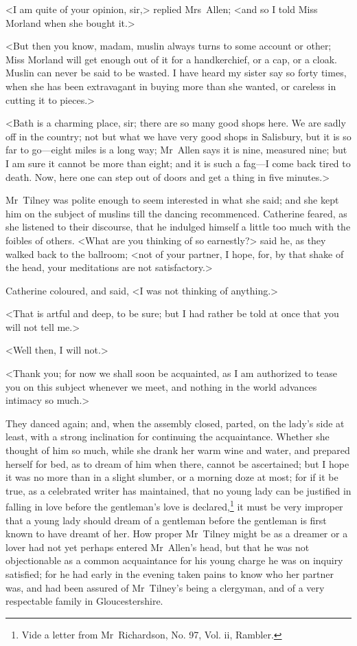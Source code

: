  <I am quite of your opinion, sir,> replied Mrs~Allen; <and so I told Miss Morland when she bought it.> 

 <But then you know, madam, muslin always turns to some account or other; Miss Morland will get enough out of it for a handkerchief, or a cap, or a cloak. Muslin can never be said to be wasted. I have heard my sister say so forty times, when she has been extravagant in buying more than she wanted, or careless in cutting it to pieces.> 

 <Bath is a charming place, sir; there are so many good shops here. We are sadly off in the country; not but what we have very good shops in Salisbury, but it is so far to go—eight miles is a long way; Mr~Allen says it is nine, measured nine; but I am sure it cannot be more than eight; and it is such a fag—I come back tired to death. Now, here one can step out of doors and get a thing in five minutes.> 

 Mr~Tilney was polite enough to seem interested in what she said; and she kept him on the subject of muslins till the dancing recommenced. Catherine feared, as she listened to their discourse, that he indulged himself a little too much with the foibles of others. <What are you thinking of so earnestly?> said he, as they walked back to the ballroom; <not of your partner, I hope, for, by that shake of the head, your meditations are not satisfactory.> 

 Catherine coloured, and said, <I was not thinking of anything.> 

 <That is artful and deep, to be sure; but I had rather be told at once that you will not tell me.> 

 <Well then, I will not.> 

 <Thank you; for now we shall soon be acquainted, as I am authorized to tease you on this subject whenever we meet, and nothing in the world advances intimacy so much.> 

 They danced again; and, when the assembly closed, parted, on the lady's side at least, with a strong inclination for continuing the acquaintance. Whether she thought of him so much, while she drank her warm wine and water, and prepared herself for bed, as to dream of him when there, cannot be ascertained; but I hope it was no more than in a slight slumber, or a morning doze at most; for if it be true, as a celebrated writer has maintained, that no young lady can be justified in falling in love before the gentleman's love is declared,\footnote{Vide a letter from Mr~Richardson, No. 97, Vol. ii, Rambler. } it must be very improper that a young lady should dream of a gentleman before the gentleman is first known to have dreamt of her. How proper Mr~Tilney might be as a dreamer or a lover had not yet perhaps entered Mr~Allen's head, but that he was not objectionable as a common acquaintance for his young charge he was on inquiry satisfied; for he had early in the evening taken pains to know who her partner was, and had been assured of Mr~Tilney's being a clergyman, and of a very respectable family in Gloucestershire. 